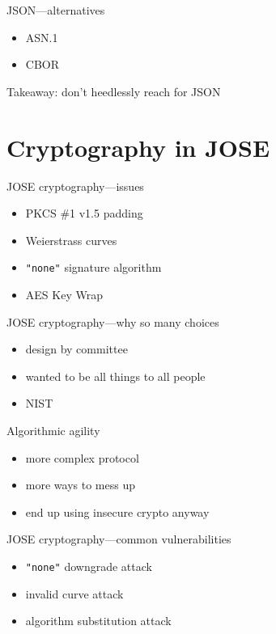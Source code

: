 \documentclass[ignorenonframetext,aspectratio=43]{beamer}
\providecommand{\tightlist}{%
  \setlength{\itemsep}{0pt}\setlength{\parskip}{0pt}}
\begin{document}
\begin{frame}{JSON---alternatives}
\begin{itemize}
\tightlist
\item ASN.1
\item CBOR
\end{itemize}
\end{frame}

\begin{frame}[plain]
\huge
Takeaway: don't heedlessly reach for JSON
\end{frame}






\section{Cryptography in JOSE}

\begin{frame}{JOSE cryptography---issues}
\begin{itemize}
\tightlist
\item PKCS \#1 v1.5 padding
\item Weierstrass curves
\item {\tt "none"} signature algorithm
\item AES Key Wrap
\end{itemize}
\end{frame}

\begin{frame}{JOSE cryptography---why so many choices}
\begin{itemize}
\tightlist
\item design by committee
\item wanted to be all things to all people
\item NIST
\end{itemize}
\end{frame}

\begin{frame}{Algorithmic agility}
\begin{itemize}
\tightlist
\item more complex protocol
\item more ways to mess up
\item end up using insecure crypto anyway
\end{itemize}
\end{frame}

\begin{frame}{JOSE cryptography---common vulnerabilities}
\begin{itemize}
\tightlist
\item {\tt "none"} downgrade attack
\item invalid curve attack
\item algorithm substitution attack
\end{itemize}
\end{frame}
\end{document}
